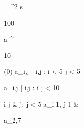 \begin{eqcode}{\mu}{\ }{\ }{^2}
  s \gets \begin {tmatrix}
  100  \lend
  \end{tmatrix} \lend
  a \gets \genar \limits ^{\begin{tmatrix} 10  \lend \end{tmatrix}} (0) \lend
  a_{i,j} | i,j : i < 5 \cap j < 5  \lend

  a_{i,j} | i,j : i  \cap j < 10 \gets
  \begin{cases}
    i \cdot j & j: j < 5 \lend
    a_{i-1, j-1} & \otherwise \lend
  \end{cases} \lend

  a_{2,7}  \lend
   \lend
\end{eqcode}
